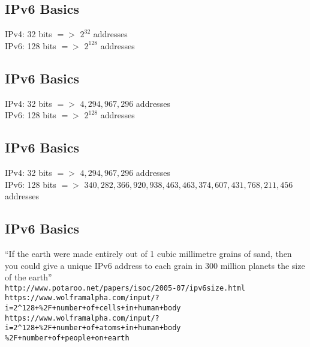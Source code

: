 \documentclass[xga]{xdvislides}
\begin{document}
\subsection{IPv6 Basics}
\Hugesize
\begin{center}
IPv4: 32 bits $=>$ $2^{32}$ addresses \\
\vspace{.5in}
IPv6: 128 bits $=>$ $2^{128}$ addresses
\end{center}
\Normalsize

\subsection{IPv6 Basics}
\Hugesize
\begin{center}
IPv4: 32 bits $=>$ $4,294,967,296$ addresses \\
\vspace{.5in}
IPv6: 128 bits $=>$ $2^{128}$ addresses
\end{center}
\Normalsize

\subsection{IPv6 Basics}
\Hugesize
\begin{center}
IPv4: 32 bits $=>$ $4,294,967,296$ addresses \\
\vspace{.5in}
IPv6: 128 bits $=>$ $340,282,366,920,938,463,463,374,607,431,768,211,456$ addresses \\
\vspace{.5in}
\end{center}
\Normalsize

\subsection{IPv6 Basics}

\vspace{.5in}
``If the earth were made entirely out of 1 cubic millimetre grains of
sand, then you could give a unique IPv6 address to each grain in 300
million planets the size of the earth'' \\

\vspace{.5in}
\verb+http://www.potaroo.net/papers/isoc/2005-07/ipv6size.html+
\\

\verb|https://www.wolframalpha.com/input/?i=2^128+%2F+number+of+cells+in+human+body|
\verb|https://www.wolframalpha.com/input/?i=2^128+%2F+number+of+atoms+in+human+body|
\verb|%2F+number+of+people+on+earth|
\end{document}
